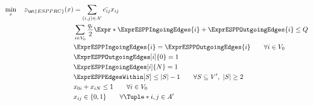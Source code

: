 \begin{align}
	\min_{x} \quad z_\mt{ESPPRC}(x) & =  \sum_{(i, j) \in A^\prime} \bar{c_{ij}} x_{ij} \label{eq:espprc-obj-function}                                                                                                               \\
	                                & \sum_{i \in V_0} \frac{q_i}{2} \Expr*{ \ExprESPPIngoingEdges{i} + \ExprESPPOutgoingEdges{i} }  \le Q                            \label{eq:espprc-resource-upper-bound-constraint}              \\
	                                & \ExprESPPIngoingEdges{i} = \ExprESPPOutgoingEdges{i}                                                \qquad \forall i \in V_0          \label{eq:espprc-flow-conservation-constraint-customers} \\
	                                & \ExprESPPOutgoingEdges[i]{0} = 1                                                                                                      \label{eq:espprc-flow-conservation-constraint-depot1}    \\
	                                & \ExprESPPIngoingEdges[i]{N} = 1                                                                                                       \label{eq:espprc-flow-conservation-constraint-depot2}    \\
	                                & \ExprESPPEdgesWithin[S] \le |S| - 1                                                                  \qquad \forall S \subseteq V^\prime,\ |S| \ge 2 \label{eq:espprc-sec-constraints}         \\
	                                & x_{0i} + x_{iN} \le 1                                                                                \qquad \forall i \in V_0         \label{eq:espprc-binding-directed}                       \\
	                                & x_{ij}                   \in \lbrace 0, 1 \rbrace                                                    \qquad \forall \Tuple*{i, j} \in A^\prime    \label{eq:espprc-x-mip-var-bounds}           \\
\end{align}

